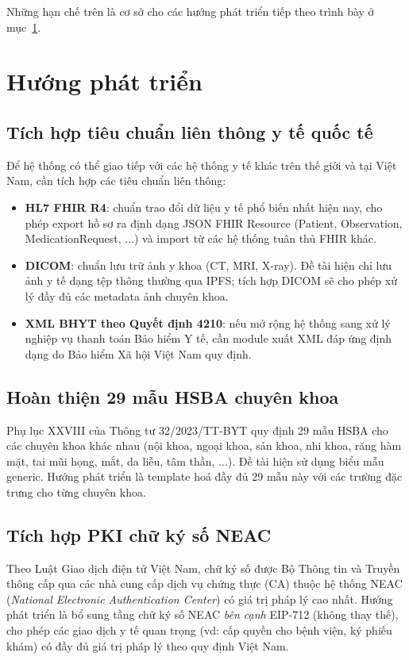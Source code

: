 \documentclass[../DoAn]{subfiles}
\begin{document}
Những hạn chế trên là cơ sở cho các hướng phát triển tiếp theo trình bày ở mục~\ref{sec:huong-phat-trien}.

\section{Hướng phát triển}
\label{sec:huong-phat-trien}

\subsection{Tích hợp tiêu chuẩn liên thông y tế quốc tế}

Để hệ thống có thể giao tiếp với các hệ thống y tế khác trên thế giới và tại Việt Nam, cần tích hợp các tiêu chuẩn liên thông:

\begin{itemize}
    \item \textbf{HL7 FHIR R4}: chuẩn trao đổi dữ liệu y tế phổ biến nhất hiện nay, cho phép export hồ sơ ra định dạng JSON FHIR Resource (Patient, Observation, MedicationRequest, ...) và import từ các hệ thống tuân thủ FHIR khác.
    \item \textbf{DICOM}: chuẩn lưu trữ ảnh y khoa (CT, MRI, X-ray). Đề tài hiện chỉ lưu ảnh y tế dạng tệp thông thường qua IPFS; tích hợp DICOM sẽ cho phép xử lý đầy đủ các metadata ảnh chuyên khoa.
    \item \textbf{XML BHYT theo Quyết định 4210}: nếu mở rộng hệ thống sang xử lý nghiệp vụ thanh toán Bảo hiểm Y tế, cần module xuất XML đáp ứng định dạng do Bảo hiểm Xã hội Việt Nam quy định.
\end{itemize}

\subsection{Hoàn thiện 29 mẫu HSBA chuyên khoa}

Phụ lục XXVIII của Thông tư 32/2023/TT-BYT quy định 29 mẫu HSBA cho các chuyên khoa khác nhau (nội khoa, ngoại khoa, sản khoa, nhi khoa, răng hàm mặt, tai mũi họng, mắt, da liễu, tâm thần, ...). Đề tài hiện sử dụng biểu mẫu generic. Hướng phát triển là template hoá đầy đủ 29 mẫu này với các trường đặc trưng cho từng chuyên khoa.

\subsection{Tích hợp PKI chữ ký số NEAC}

Theo Luật Giao dịch điện tử Việt Nam, chữ ký số được Bộ Thông tin và Truyền thông cấp qua các nhà cung cấp dịch vụ chứng thực (CA) thuộc hệ thống NEAC (\textit{National Electronic Authentication Center}) có giá trị pháp lý cao nhất. Hướng phát triển là bổ sung tầng chữ ký số NEAC \textit{bên cạnh} EIP-712 (không thay thế), cho phép các giao dịch y tế quan trọng (vd: cấp quyền cho bệnh viện, ký phiếu khám) có đầy đủ giá trị pháp lý theo quy định Việt Nam.
\end{document}
